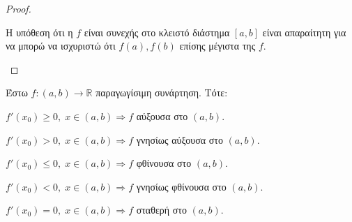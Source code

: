 \documentclass[main.tex]{subfiles}
\begin{document}
\begin{proof}
 \begin{rem}
    Η υπόθεση ότι η $f$ είναι συνεχής στο κλειστό διάστημα $ [a,b] $ είναι 
    απαραίτητη για να μπορώ να ισχυριστώ ότι $ f(a), f(b) $ επίσης μέγιστα της $f$.
\end{rem}   
\end{proof}

\begin{thm}
    Έστω $ f \colon (a,b) \to \mathbb{R} $ παραγωγίσιμη συνάρτηση. Τότε:
    \begin{myitemize}
    \item $ f'(x_{0}) \geq 0, \; x \in (a,b) \Rightarrow f $ αύξουσα στο $ (a,b) $.
    \item $ f'(x_{0}) > 0, \; x \in (a,b) \Rightarrow f $ γνησίως αύξουσα στο $ (a,b) $.
    \item $ f'(x_{0}) \leq 0, \; x \in (a,b) \Rightarrow f $ φθίνουσα στο $ (a,b) $.
    \item $ f'(x_{0}) < 0, \; x \in (a,b) \Rightarrow f$ γνησίως φθίνουσα στο $ (a,b) $.
    \item $ f'(x_{0}) = 0, \; x \in (a,b) \Rightarrow f $ σταθερή στο $ (a,b) $.
    \end{myitemize}
\end{thm}
\end{document}
